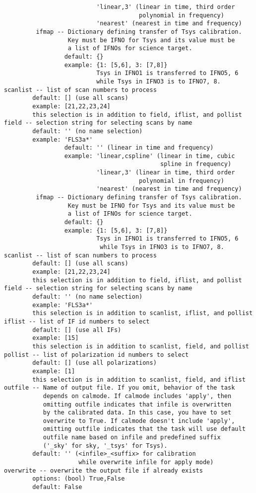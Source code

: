 \begin{verbatim}
                          'linear,3' (linear in time, third order 
                                      polynomial in frequency)
                          'nearest' (nearest in time and frequency)
         ifmap -- Dictionary defining transfer of Tsys calibration. 
                  Key must be IFNO for Tsys and its value must be 
                  a list of IFNOs for science target.
                 default: {}
                 example: {1: [5,6], 3: [7,8]}
                          Tsys in IFNO1 is transferred to IFNO5, 6 
                          while Tsys in IFNO3 is to IFNO7, 8.
scanlist -- list of scan numbers to process
        default: [] (use all scans)
        example: [21,22,23,24]
        this selection is in addition to field, iflist, and pollist
field -- selection string for selecting scans by name
        default: '' (no name selection)
        example: 'FLS3a*'
                 default: '' (linear in time and frequency)
                 example: 'linear,cspline' (linear in time, cubic 
                                            spline in frequency)
                          'linear,3' (linear in time, third order 
                                      polynomial in frequency)
                          'nearest' (nearest in time and frequency)
         ifmap -- Dictionary defining transfer of Tsys calibration. 
                  Key must be IFNO for Tsys and its value must be 
                  a list of IFNOs for science target.
                 default: {}
                 example: {1: [5,6], 3: [7,8]}
                          Tsys in IFNO1 is transferred to IFNO5, 6 
                           while Tsys in IFNO3 is to IFNO7, 8.
scanlist -- list of scan numbers to process
        default: [] (use all scans)
        example: [21,22,23,24]
        this selection is in addition to field, iflist, and pollist
field -- selection string for selecting scans by name
        default: '' (no name selection)
        example: 'FLS3a*'
        this selection is in addition to scanlist, iflist, and pollist
iflist -- list of IF id numbers to select
        default: [] (use all IFs)
        example: [15]
        this selection is in addition to scanlist, field, and pollist
pollist -- list of polarization id numbers to select
        default: [] (use all polarizations)
        example: [1]
        this selection is in addition to scanlist, field, and iflist
outfile -- Name of output file. If you omit, behavior of the task 
           depends on calmode. If calmode includes 'apply', then 
           omitting outfile indicates that infile is overwritten 
           by the calibrated data. In this case, you have to set 
           overwrite to True. If calmode doesn't include 'apply', 
           omitting outfile indicates that the task will use default 
           outfile name based on infile and predefined suffix 
           ('_sky' for sky, '_tsys' for Tsys).
        default: '' (<infile>_<suffix> for calibration 
                     while overwrite infile for apply mode)
overwrite -- overwrite the output file if already exists
        options: (bool) True,False
        default: False

\end{verbatim}

